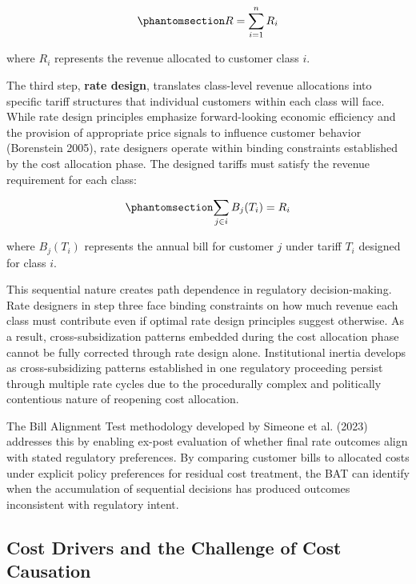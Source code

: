 \documentclass[
  11pt,
]{article}
\begin{document}
\begin{equation}\phantomsection\label{eq-allocation}{R = \sum_{i=1}^{n} R_i}\end{equation}

where \(R_i\) represents the revenue allocated to customer class \(i\).

The third step, \textbf{rate design}, translates class-level revenue
allocations into specific tariff structures that individual customers
within each class will face. While rate design principles emphasize
forward-looking economic efficiency and the provision of appropriate
price signals to influence customer behavior (Borenstein 2005), rate
designers operate within binding constraints established by the cost
allocation phase. The designed tariffs must satisfy the revenue
requirement for each class:

\begin{equation}\phantomsection\label{eq-tariff}{\sum_{j \in i} B_j(T_i) = R_i}\end{equation}

where \(B_j(T_i)\) represents the annual bill for customer \(j\) under
tariff \(T_i\) designed for class \(i\).

This sequential nature creates path dependence in regulatory
decision-making. Rate designers in step three face binding constraints
on how much revenue each class must contribute even if optimal rate
design principles suggest otherwise. As a result, cross-subsidization
patterns embedded during the cost allocation phase cannot be fully
corrected through rate design alone. Institutional inertia develops as
cross-subsidizing patterns established in one regulatory proceeding
persist through multiple rate cycles due to the procedurally complex and
politically contentious nature of reopening cost allocation.

The Bill Alignment Test methodology developed by Simeone et al. (2023)
addresses this by enabling ex-post evaluation of whether final rate
outcomes align with stated regulatory preferences. By comparing customer
bills to allocated costs under explicit policy preferences for residual
cost treatment, the BAT can identify when the accumulation of sequential
decisions has produced outcomes inconsistent with regulatory intent.

\subsection{Cost Drivers and the Challenge of Cost
Causation}\label{cost-drivers-and-the-challenge-of-cost-causation}
\end{document}
